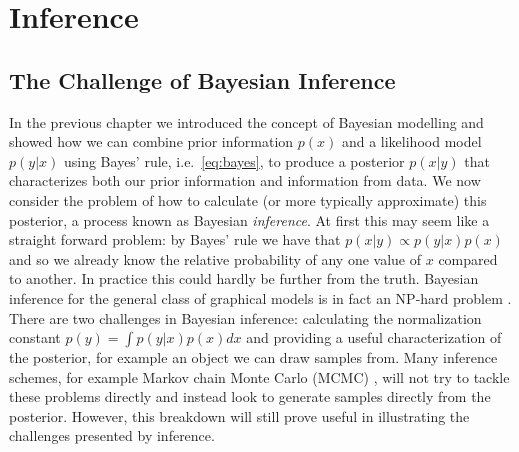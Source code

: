
\chapter{Inference}
\label{sec:inf}

\section{The Challenge of Bayesian Inference}
\label{sec:inf:challenge}

In the previous chapter we introduced the concept of Bayesian modelling and showed how we
can combine prior information $p(x)$ and a likelihood model $p(y|x)$ using Bayes' rule,
i.e.~\eqref{eq:bayes}, to produce a posterior $p(x|y)$ that
characterizes both our prior information and information from data.  We now consider the
problem of how to calculate (or more typically approximate) this posterior, a process 
known as Bayesian \emph{inference}.
At first this may seem like a straight forward problem: by Bayes' rule we have that
$p(x|y)\propto p(y|x)p(x)$ and so we already know the relative probability of any one
value of $x$ compared to another.  In practice this could hardly be further from the
truth.  Bayesian inference for the general class of graphical models is in fact an 
NP-hard problem \citep{cooper1990computational,dagum1993approximating}.  There are two
challenges in Bayesian inference: calculating the normalization constant
$p(y) = \int p(y|x)p(x)dx$ and providing a useful characterization of the posterior, for
example an object we can draw samples from.  Many inference schemes, for example Markov
chain Monte Carlo (MCMC) \citep{hastings1970monte}, will not
try to tackle these problems directly and instead look to generate samples directly from 
the posterior.  However, this breakdown will still prove useful in illustrating the challenges
presented by inference.

